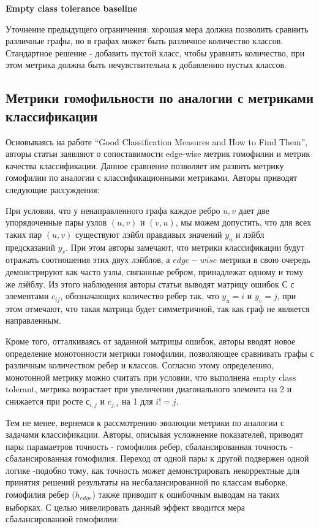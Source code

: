 \documentclass[a4paper,14pt]{article}
\begin{document}
	\textbf{Empty class tolerance baseline}
	
	Уточнение предыдущего ограничения: хорошая мера должна позволить сравнить различные графы, но в графах может быть различное количество классов. Стандартное решение - добавить пустой класс, чтобы уравнять количество, при этом метрика должна быть нечувствительна к добавлению пустых классов.
	
	
	\subsection{Метрики гомофильности по аналогии с метриками классификации}
	
	Основываясь на работе “Good Classification Measures and How to Find Them”, авторы статьи заявляют о сопоставимости edge-wise метрик гомофилии и метрик качества классификации.
	Данное сравнение позволяет им развить метрику гомофилии по аналогии с классификационными метриками. Авторы приводят следующие рассуждения:
	
	При условии, что у ненаправленного графа каждое ребро ${u, v}$ дает две упорядоченные пары узлов $(u, v)$ и $(v, u)$, мы можем допустить, что для всех таких пар $(u, v)$ существуют лэйбл правдивых значений $y_u$ и лэйбл предсказаний $y_v$.
	При этом авторы замечают, что метрики классификации будут отражать соотношения этих двух лэйблов, а $edge-wise$ метрики в свою очередь демонстрируют как часто узлы, связанные ребром, принадлежат одному и тому же лэйблу.
	Из этого наблюдения авторы статьи выводят матрицу ошибок С с элементами $c_{ij}$, обозначающих количество ребер так, что $y_u = i$ и $y_v = j$, при этом отмечают, что такая матрица будет симметричной, так как граф не является направленным.
	
	Кроме того, отталкиваясь от заданной матрицы ошибок, авторы вводят новое определение монотонности метрики гомофилии, позволяющее сравнивать графы с различным количеством ребер и классов.
	Согласно этому определению, монотонной метрику можно считать при условии, что выполнена empty class tolerant, метрика возрастает при увеличении диагонального элемента на 2 и снижается при росте $с_{i,j}$ и $c_{j,i}$  на 1 для $i!=j$.
	
	Тем не менее, вернемся к рассмотрению эволюции метрики по аналогии с задачами классификации.
	Авторы, описывая усложнение показателей, приводят пары парамаетров точность - гомофилия ребер, сбалансированная точность - сбалансированная гомофилия.
	Переход от одной пары к другой подвержен одной логике -подобно тому, как точность может демонстрировать некорректные для принятия решений результаты на несбалансированной по классам выборке, гомофилия ребер ($h_{edge}$) также приводит к ошибочным выводам на таких выборках.
	С целью нивелировать данный эффект вводится мера сбалансированной гомофилии:
	
\end{document}
